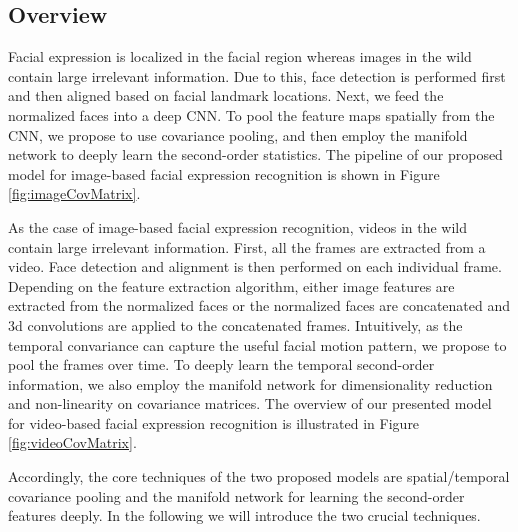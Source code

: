 \documentclass[10pt,twocolumn,letterpaper]{article}
\begin{document}


\subsection{Overview}
Facial expression is localized in the facial region whereas images in the wild contain large irrelevant information. Due to this, face detection is performed first and then aligned based on facial landmark locations. Next, we feed the normalized faces into a deep CNN. To pool the feature maps spatially from the CNN, we propose to use covariance pooling, and then employ the manifold network \cite{spdnet} to deeply learn the second-order statistics. The pipeline of our proposed model for image-based facial expression recognition is shown in Figure \ref{fig:imageCovMatrix}.

As the case of image-based facial expression recognition, videos in the wild contain large irrelevant information. First, all the frames are extracted from a video. Face detection and alignment is then performed on each individual frame. Depending on the feature extraction algorithm, either image features are extracted from the normalized faces or the normalized faces are concatenated and 3d convolutions are applied to the concatenated frames. Intuitively, as the temporal convariance can capture the useful facial motion pattern, we propose to pool the frames over time. To deeply learn the temporal second-order information, we also employ the manifold network \cite{spdnet} for dimensionality reduction and non-linearity on covariance matrices. The overview of our presented model for video-based facial expression recognition is illustrated in Figure \ref{fig:videoCovMatrix}.
    
Accordingly, the core techniques of the two proposed models are spatial/temporal covariance pooling and the manifold network for learning the second-order features deeply. In the following we will introduce the two crucial techniques.
    
\end{document}

